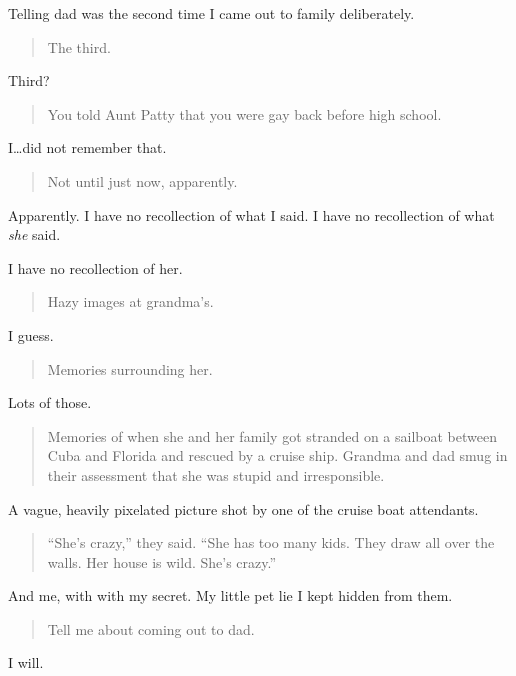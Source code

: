 Telling dad was the second time I came out to family deliberately.

\begin{quote}
The third.
\end{quote}

Third?

\begin{quote}
You told Aunt Patty that you were gay back before high school.
\end{quote}

I\ldots{}did not remember that.

\begin{quote}
Not until just now, apparently.
\end{quote}

Apparently. I have no recollection of what I said. I have no recollection of what \emph{she} said.

I have no recollection of her.

\begin{quote}
Hazy images at grandma's.
\end{quote}

I guess.

\begin{quote}
Memories surrounding her.
\end{quote}

Lots of those.

\begin{quote}
Memories of when she and her family got stranded on a sailboat between Cuba and Florida and rescued by a cruise ship. Grandma and dad smug in their assessment that she was stupid and irresponsible.
\end{quote}

A vague, heavily pixelated picture shot by one of the cruise boat attendants.

\begin{quote}
``She's crazy,'' they said. ``She has too many kids. They draw all over the walls. Her house is wild. She's crazy.''
\end{quote}

And me, with with my secret. My little pet lie I kept hidden from them.

\begin{quote}
Tell me about coming out to dad.
\end{quote}

I will.
